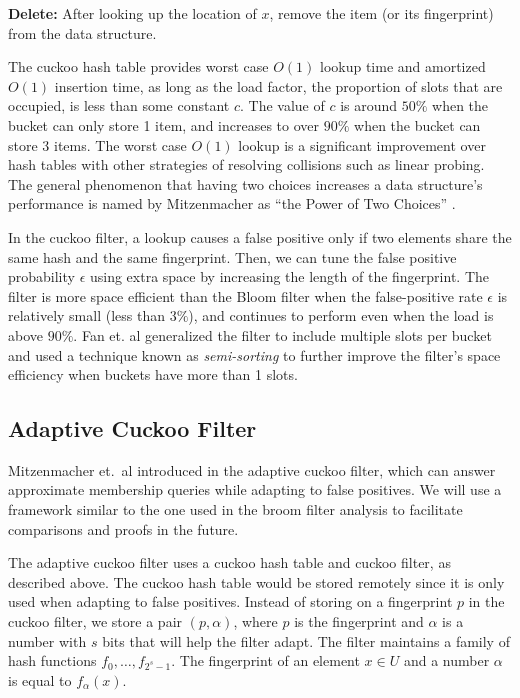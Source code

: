 \documentclass[../paper.tex]{subfiles}
\begin{document}
\textbf{Delete:} After looking up the location of $x$, remove the item (or its fingerprint) from the data structure.

The cuckoo hash table provides worst case $O(1)$ lookup time and amortized $O(1)$ insertion time, as long as the load factor, the proportion of slots that are occupied, is less than some constant $c$.
The value of $c$ is around $50\%$ when the bucket can only store 1 item, and increases to over $90\%$ when the bucket can store 3 items. The worst case $O(1)$ lookup is a significant improvement over hash tables
with other strategies of resolving collisions such as linear probing. The general phenomenon that having two choices increases a data structure's performance is named by Mitzenmacher as ``the Power of Two Choices'' \cite{prob-textbook}.

In the cuckoo filter, a lookup causes a false positive only if two elements share the same hash and the same fingerprint. Then, we can tune the false positive probability $\epsilon$ using extra space by increasing the length of the fingerprint.
The filter is more space efficient than the Bloom filter when the false-positive rate $\epsilon$ is relatively small (less than $3\%$), and continues to perform even when the load is above $90\%$.
Fan et. al \cite{cuckoo-filter} generalized the filter to include multiple slots per bucket and used a technique known as \emph{semi-sorting} to further improve the filter's space efficiency when buckets have more than 1 slots.

\subsection{Adaptive Cuckoo Filter}
Mitzenmacher et.\ al introduced in \cite{adaptive-cuckoo} the adaptive cuckoo filter, which can answer approximate membership queries while adapting to false positives. We will use a framework similar
to the one used in the broom filter analysis \cite{broom-filter} to facilitate comparisons and proofs in the future.

The adaptive cuckoo filter uses a cuckoo hash table and cuckoo filter, as described above. The cuckoo hash table would be stored remotely since it is only used when adapting to false positives.
Instead of storing on a fingerprint $p$ in the cuckoo filter, we store a pair $(p,\alpha)$, where $p$ is the fingerprint and $\alpha$ is a number with $s$ bits that will help the filter adapt. 
The filter maintains a family of hash functions $f_0,\ldots,f_{2^s-1}$. The fingerprint of an element $x\in U$ and a number $\alpha$ is equal to $f_\alpha(x)$.
\end{document}
